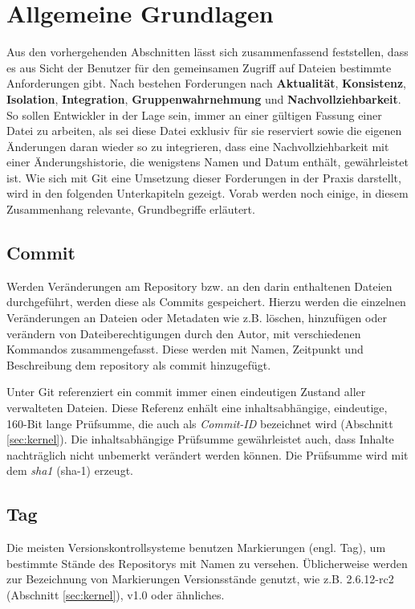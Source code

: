 \section{Allgemeine Grundlagen}\label{sec:Grundlagen}
Aus den vorhergehenden Abschnitten lässt sich zusammenfassend feststellen, dass
es aus Sicht der Benutzer für den gemeinsamen Zugriff auf Dateien bestimmte
Anforderungen gibt. Nach \cite[S.~37]{hagen:1678} bestehen Forderungen nach
\textbf{Aktualität}, \textbf{Konsistenz}, \textbf{Isolation},
\textbf{Integration}, \textbf{Gruppenwahrnehmung} und
\textbf{Nachvollziehbarkeit}. So sollen Entwickler in der Lage sein, immer an
einer gültigen Fassung einer Datei zu arbeiten, als sei diese Datei exklusiv für
sie reserviert sowie die eigenen Änderungen daran wieder so zu integrieren, dass
eine Nachvollziehbarkeit mit einer Änderungshistorie, die wenigstens Namen und
Datum enthält, gewährleistet ist. Wie sich mit Git eine Umsetzung dieser
Forderungen in der Praxis darstellt, wird in den folgenden Unterkapiteln
gezeigt. Vorab werden noch einige, in diesem Zusammenhang relevante,
Grundbegriffe erläutert.

\subsection{Commit}\label{sec:commit}
Werden Veränderungen am Repository bzw. an den darin enthaltenen
Dateien durchgeführt, werden diese als Commits gespeichert. Hierzu werden die einzelnen
Veränderungen an Dateien oder Metadaten wie z.B. löschen, hinzufügen oder verändern
von Dateiberechtigungen durch den Autor, mit verschiedenen Kommandos
zusammengefasst. Diese werden mit Namen, Zeitpunkt und Beschreibung dem
\gls{repository} als \gls{commit} hinzugefügt. \cite[S.~20]{gitosp}

Unter Git referenziert ein \gls{commit} immer einen eindeutigen Zustand aller
verwalteten Dateien. Diese Referenz enhält eine inhaltsabhängige, eindeutige,
160-Bit lange Prüfsumme, die auch als \textit{Commit-ID} bezeichnet
wird (Abschnitt \ref{sec:kernel}). Die inhaltsabhängige Prüfsumme gewährleistet
auch, dass Inhalte nachträglich nicht unbemerkt verändert werden können. Die
Prüfsumme wird mit dem \textit{\gls{sha1}} (\acrshort{sha-1})
erzeugt. \cite[S.~20-21]{gitosp}

\subsection{Tag}\label{sec:tag}
Die meisten Versionskontrollsysteme benutzen Markierungen (engl. Tag), um
bestimmte Stände des Repositorys mit Namen zu versehen. Üblicherweise werden
zur Bezeichnung von Markierungen Versionsstände genutzt, wie z.B.
2.6.12-rc2 (Abschnitt \ref{sec:kernel}), v1.0 oder ähnliches. \cite[S.~48]{progit}

